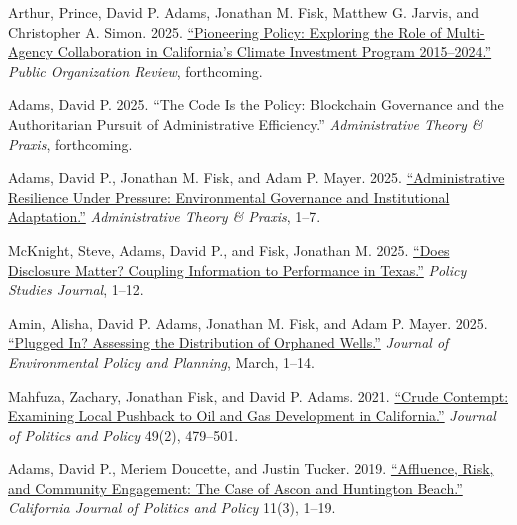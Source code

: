 \documentclass[12pt,letterpaper]{article}
\renewenvironment{itemize}{
  \begin{list}{}{
    \setlength{\leftmargin}{1.5em}
    \setlength{\itemsep}{0.25em}
    \setlength{\parskip}{0pt}
    \setlength{\parsep}{0.25em}
  }
}{
  \end{list}
}
\begin{document}
\begin{itemize}\leftmargin=2pt\itemindent=-15pt\leftmargin=2pt\itemindent=-15pt

    \item Arthur, Prince, David P. Adams, Jonathan M. Fisk, Matthew G. Jarvis, and Christopher A. Simon. 2025. \href{https://doi.org/10.1007/s11115-025-00586-3}{``Pioneering Policy: Exploring the Role of Multi-Agency Collaboration in California's Climate Investment Program 2015--2024.''} \emph{Public Organization Review}, forthcoming.

    \item Adams, David P. 2025. ``The Code Is the Policy: Blockchain Governance and the Authoritarian Pursuit of Administrative Efficiency.'' \emph{Administrative Theory \& Praxis}, forthcoming.

    \item Adams, David P., Jonathan M. Fisk, and Adam P. Mayer. 2025. \href{https://doi.org/10.1080/10841806.2025.2537600}{``Administrative Resilience Under Pressure: Environmental Governance and Institutional Adaptation.''} \emph{Administrative Theory \& Praxis}, 1--7.

    \item McKnight, Steve, Adams, David P., and Fisk, Jonathan M. 2025. \href{https://doi.org/10.1111/psj.70064}{``Does Disclosure Matter? Coupling Information to Performance in Texas.''} \emph{Policy Studies Journal}, 1--12.

    \item Amin, Alisha, David P. Adams, Jonathan M. Fisk, and Adam P. Mayer. 2025. \href{https://doi.org/10.1080/1523908X.2025.2480289}{``Plugged In? Assessing the Distribution of Orphaned Wells.''} \emph{Journal of Environmental Policy and Planning}, March, 1--14.

    \item Mahfuza, Zachary, Jonathan Fisk, and David P. Adams. 2021. \href{https://doi.org/10.1111/polp.12401}{``Crude Contempt: Examining Local Pushback to Oil and Gas Development in California.''} \emph{Journal of Politics and Policy} 49(2), 479--501.

    \item Adams, David P., Meriem Doucette, and Justin Tucker. 2019. \href{https://escholarship.org/uc/item/2mz2n6qk}{``Affluence, Risk, and Community Engagement: The Case of Ascon and Huntington Beach.''} \emph{California Journal of Politics and Policy} 11(3), 1--19.   

\end{itemize}
\end{document}
